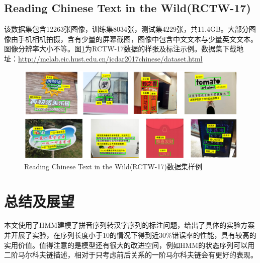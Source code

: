 \documentclass[12pt,a4paper]{ctexart}
\begin{document}
\subsection{Reading Chinese Text in the Wild(RCTW-17)}
该数据集包含12263张图像，训练集8034张，测试集4229张，共11.4GB。大部分图像由手机相机拍摄，含有少量的屏幕截图，图像中包含中文文本与少量英文文本。图像分辨率大小不等。图\ref{fig:rctw17_example}为RCTW-17数据的样张及标注示例。数据集下载地址：\url{http://mclab.eic.hust.edu.cn/icdar2017chinese/dataset.html}
\begin{figure}[H]
	\centering
	\includegraphics[width=1\linewidth]{images/rctw17_example}
	\caption{Reading Chinese Text in the Wild(RCTW-17)数据集样例}
	\label{fig:rctw17_example}
\end{figure}

\section{总结及展望}
本文使用了HMM建模了拼音序列转汉字序列的标注问题，给出了具体的实验方案并开展了实验，在序列长度小于10的情况下得到近30\%错误率的性能，具有较高的实用价值。值得注意的是模型还有很大的改进空间，例如HMM的状态序列可以用二阶马尔科夫链描述，相对于只考虑前后关系的一阶马尔科夫链会有更好的表现。


\printbibliography[heading=bibliography,title=参考文献]
\end{document}
